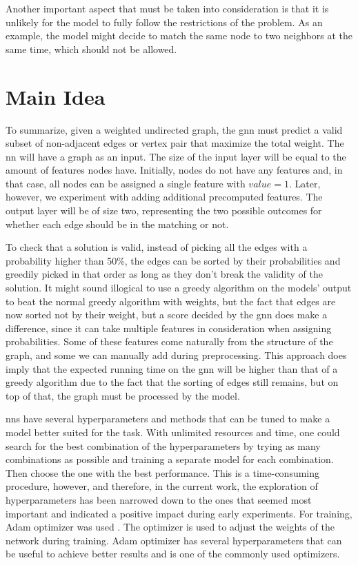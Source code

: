 Another important aspect that must be taken into consideration is that it is unlikely for the model to fully follow the restrictions of the problem. As an example, the model might decide to match the same node to two neighbors at the same time, which should not be allowed. 

\section{Main Idea}

To summarize, given a weighted undirected graph, the \gls{gnn} must predict a valid subset of non-adjacent edges or vertex pair that maximize the total weight. The \gls{nn} will have a graph as an input. The size of the input layer will be equal to the amount of features nodes have. Initially, nodes do not have any features and, in that case, all nodes can be assigned a single feature with $value = 1$. Later, however, we experiment with adding additional precomputed features. The output layer will be of size two, representing the two possible outcomes for whether each edge should be in the matching or not. 

To check that a solution is valid, instead of picking all the edges with a probability higher than 50\%, the edges can be sorted by their probabilities and greedily picked in that order as long as they don't break the validity of the solution. It might sound illogical to use a greedy algorithm on the models' output to beat the normal greedy algorithm with weights, but the fact that edges are now sorted not by their weight, but a score decided by the \gls{gnn} does make a difference, since it can take multiple features in consideration when assigning probabilities. Some of these features come naturally from the structure of the graph, and some we can manually add during preprocessing. This approach does imply that the expected running time on the \gls{gnn} will be higher than that of a greedy algorithm due to the fact that the sorting of edges still remains, but on top of that, the graph must be processed by the model.

\gls{nn}s have several hyperparameters and methods that can be tuned to make a model better suited for the task. With unlimited resources and time, one could search for the best combination of the hyperparameters by trying as many combinations as possible and training a separate model for each combination. Then choose the one with the best performance. This is a time-consuming procedure, however, and therefore, in the current work, the exploration of hyperparameters has been narrowed down to the ones that seemed most important and indicated a positive impact during early experiments. For training, Adam optimizer was used \cite{kingma2017adam}. The optimizer is used to adjust the weights of the network during training. Adam optimizer has several hyperparameters that can be useful to achieve better results and is one of the commonly used optimizers.

